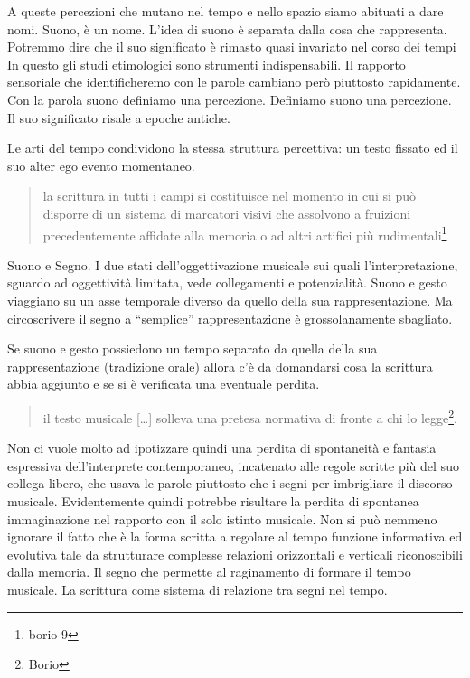 
A queste percezioni che mutano nel tempo e nello spazio siamo abituati a dare nomi. Suono, è un nome.
L'idea di suono è separata dalla cosa che rappresenta.
Potremmo dire che il suo significato è rimasto quasi invariato nel corso dei tempi
In questo gli studi etimologici sono strumenti indispensabili.
Il rapporto sensoriale che identificheremo con le parole cambiano però piuttosto rapidamente.
Con la parola suono definiamo una percezione. Definiamo suono una percezione.
Il suo significato risale a epoche antiche.

Le arti del tempo condividono la stessa struttura percettiva: un testo fissato ed il suo alter ego evento momentaneo.

\begin{quote}
	la scrittura in tutti i campi si costituisce nel momento in cui si può disporre di un sistema di marcatori visivi che assolvono a fruizioni precedentemente affidate alla memoria o ad altri artifici più rudimentali\footnote{borio 9}
\end{quote}

Suono e Segno. I due stati dell'oggettivazione musicale sui quali l'interpretazione, sguardo ad oggettività limitata, vede collegamenti e potenzialità. Suono e gesto viaggiano su un asse temporale diverso da quello della sua rappresentazione. Ma circoscrivere il segno a “semplice” rappresentazione è grossolanamente sbagliato.

Se suono e gesto possiedono un tempo separato da quella della sua rappresentazione (tradizione orale) allora c'è da domandarsi cosa la scrittura abbia aggiunto e se si è verificata una eventuale perdita.

\begin{quote}
	il testo musicale [\ldots] solleva una pretesa normativa di fronte a chi lo legge\footnote{Borio}.
\end{quote}

Non ci vuole molto ad ipotizzare quindi una perdita di spontaneità e fantasia espressiva dell'interprete contemporaneo, incatenato alle regole scritte più del suo collega libero, che usava le parole piuttosto che i segni per imbrigliare il discorso musicale. Evidentemente quindi potrebbe risultare la perdita di spontanea immaginazione nel rapporto con il solo istinto musicale. Non si può nemmeno ignorare il fatto che è la forma scritta a regolare al tempo funzione informativa ed evolutiva tale da strutturare complesse relazioni orizzontali e verticali riconoscibili dalla memoria. Il segno che permette al raginamento di formare il tempo musicale. La scrittura come sistema di relazione tra segni nel tempo.

